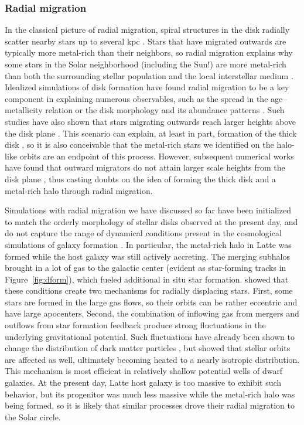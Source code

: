 \documentclass[apj, twocolappendix, numberedappendix, appendixfloats]{emulateapj}
\begin{document}
\subsubsection{Radial migration}
\label{sec:migration}
In the classical picture of radial migration, spiral structures in the disk radially scatter nearby stars up to several kpc \citep{sellwood2002}.
Stars that have migrated outwards are typically more metal-rich than their neighbors, so radial migration explains why some stars in the Solar neighborhood (including the Sun!) are more metal-rich than both the surrounding stellar population and the local interstellar medium \citep{wielen1996}.
Idealized simulations of disk formation have found radial migration to be a key component in explaining numerous observables, such as the spread in the age--metallicity relation \citep{roskar2008} or the disk morphology and its abundance patterns \citep{schonrich2009}.
Such studies have also shown that stars migrating outwards reach larger heights above the disk plane \citep[e.g.,][]{schonrich2009, loebman2011}.
This scenario can explain, at least in part, formation of the thick disk \citep[e.g.,][]{wilson2011}, so it is also conceivable that the metal-rich stars we identified on the halo-like orbits are an endpoint of this process.
However, subsequent numerical works have found that outward migrators do not attain larger scale heights from the disk plane \citep{minchev2012, vera-ciro2014}, thus casting doubts on the idea of forming the thick disk and a metal-rich halo through radial migration.

Simulations with radial migration we have discussed so far have been initialized to match the orderly morphology of stellar disks observed at the present day, and do not capture the range of dynamical conditions present in the cosmological simulations of galaxy formation \citep[e.g.,][]{agertz2009}.
In particular, the metal-rich halo in Latte was formed while the host galaxy was still actively accreting.
The merging subhalos brought in a lot of gas to the galactic center (evident as star-forming tracks in Figure~\ref{fig:dform}), which fueled additional in situ star formation.
\citet{elbadry2016} showed that these conditions create two mechanisms for radially displacing stars.
First, some stars are formed in the large gas flows, so their orbits can be rather eccentric and have large apocenters.
Second, the combination of inflowing gas from mergers and outflows from star formation feedback produce strong fluctuations in the underlying gravitational potential.
Such fluctuations have already been shown to change the distribution of dark matter particles \citep[e.g.,][]{pontzen2012, brooks2014, dicintio2014}, but \citet{elbadry2016} showed that stellar orbits are affected as well, ultimately becoming heated to a nearly isotropic distribution.
This mechanism is most efficient in relatively shallow potential wells of dwarf galaxies.
At the present day, Latte host galaxy is too massive to exhibit such behavior, but its progenitor was much less massive while the metal-rich halo was being formed, so it is likely that similar processes drove their radial migration to the Solar circle.
\end{document}
